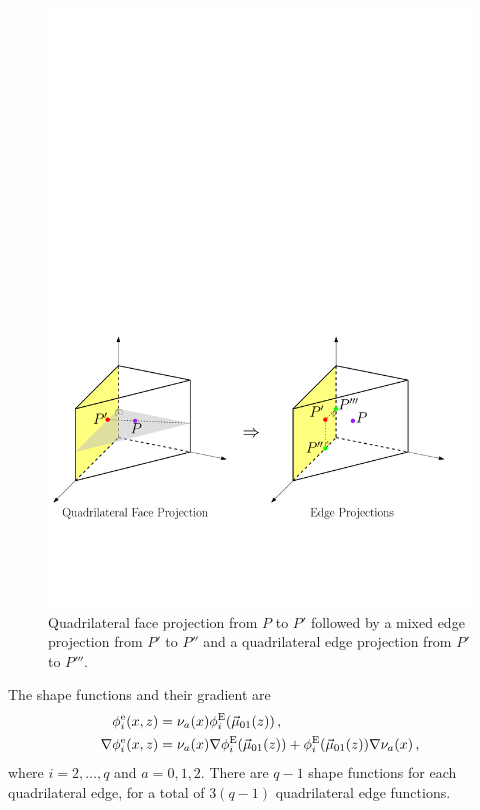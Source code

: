 \begin{figure}[!ht]
\begin{center}
\includegraphics[scale=0.6]{./figures/PrismProjectionQuad.pdf}
\caption{Quadrilateral face projection from $P$ to $P'$ followed by a mixed edge projection from $P'$ to $P''$ and a quadrilateral edge projection from $P'$ to $P'''$.}
\label{fig:PrismProjectionQuad}
\end{center}
\end{figure}

The shape functions and their gradient are
\begin{equation}
	\begin{aligned}	
		\phi_i^\mathrm{e}(x,z)&=\nu_a(x)\phi_i^{\mathrm{E}}(\vec{\mu}_{01}(z))\,,\\
		\nabla\phi_i^\mathrm{e}(x,z)&=\nu_a(x)\nabla\phi_i^{\mathrm{E}}(\vec{\mu}_{01}(z))+\phi_i^{\mathrm{E}}(\vec{\mu}_{01}(z))\nabla\nu_a(x)\,,
	\end{aligned}\label{eq:PrismH1quadedges}
\end{equation}
where $i=2,\ldots,q$ and $a=0,1,2$. 
There are $q-1$ shape functions for each quadrilateral edge, for a total of $3(q-1)$ quadrilateral edge functions.

